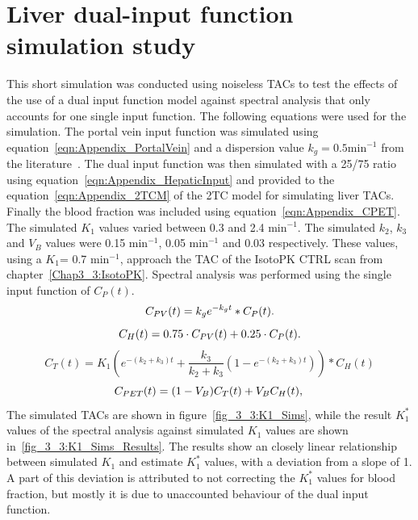 \section*{Liver dual-input function simulation study}
This short simulation was conducted using noiseless TACs to test the effects of the use of a dual input function model against spectral analysis that only accounts for one single input function.  
The following equations were used for the simulation. The portal vein input function was simulated using equation~\ref{eqn:Appendix_PortalVein} and a dispersion value $k_g=0.5 \mathrm{min}^{-1}$ from the literature~\cite{Kudomi2008}.
The dual input function was then simulated with a 25/75 ratio using equation~\ref{eqn:Appendix_HepaticInput} and provided to the equation~\ref{eqn:Appendix_2TCM} of the 2TC model for simulating liver TACs. Finally the blood fraction was included using equation~\ref{eqn:Appendix_CPET}. The simulated $K_1$ values varied between 0.3 and 2.4 min$^{-1}$. The simulated $k_2$, $k_3$ and $V_B$ values were 0.15 min$^{-1}$, 0.05 min$^{-1}$ and 0.03 respectively. These values, using a $K_1$= 0.7 min$^{-1}$, approach the TAC of the IsotoPK CTRL scan from chapter~\ref{Chap3_3:IsotoPK}. 
Spectral analysis was performed using the single input function of $C_{P}(t)$. 
%
\begin{equation} 
{C_{PV}}(t)  = {k_g} e^{-k_g t} \ast C_P(t)   \\ . \\
\label{eqn:Appendix_PortalVein}
\end{equation}
%
\begin{equation} 
{C_{H}}(t)  = 0.75 \cdot C_{PV}(t) + 0.25 \cdot C_{P}(t)  \\ . \\
\label{eqn:Appendix_HepaticInput}
\end{equation}
%
\begin{equation}
C_T(t) = K_1 ( e^{-(k_2+k_3)t} + \frac{k_3}{k_2+k_3}(1-e^{-(k_2+k_3)t})) \ast C_{H}(t)   
\label{eqn:Appendix_2TCM}
\end{equation}
%
\begin{equation}
{C_{PET}}(t)  = (1-V_{B}){C_{T}}(t) + V_{B}C_{H}(t) \\ , \\
\label{eqn:Appendix_CPET}
\end{equation}
%
%
The simulated TACs are shown in figure~\ref{fig_3_3:K1_Sims}, while the result $K_1^{*}$ values of the spectral analysis against simulated $K_1$ values are shown in~\ref{fig_3_3:K1_Sims_Results}. The results show an closely linear relationship between simulated $K_1$ and estimate $K_1^{*}$ values, with a deviation from a slope of 1. A part of this deviation is attributed to not correcting the $K_1^{*}$ values for blood fraction, but mostly it is due to unaccounted behaviour of the dual input function.

